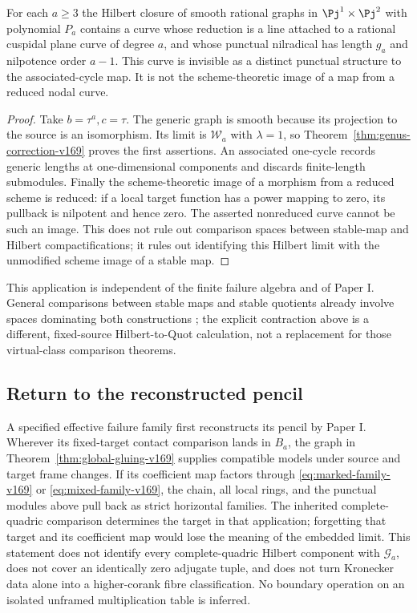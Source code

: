 \begin{corollary}
\label{cor:external-curves-v169}
For each $a\geq3$ the Hilbert closure of smooth rational graphs in
$\Pj^1\times\Pj^2$ with polynomial $P_a$ contains a curve whose
reduction is a line attached to a rational cuspidal plane curve of
degree $a$, and whose punctual nilradical has length $g_a$ and
nilpotence order $a-1$. This curve is invisible as a distinct punctual
structure to the associated-cycle map. It is not the scheme-theoretic
image of a map from a reduced nodal curve.
\end{corollary}
\begin{proof}
Take $b=\tau^a,c=\tau$. The generic graph is smooth because its
projection to the source is an isomorphism. Its limit is
$\mathcal W_a$ with $\lambda=1$, so
Theorem~\ref{thm:genus-correction-v169} proves the first assertions.
An associated one-cycle records generic lengths at one-dimensional
components and discards finite-length submodules. Finally the
scheme-theoretic image of a morphism from a reduced scheme is reduced:
if a local target function has a power mapping to zero, its pullback
is nilpotent and hence zero. The asserted nonreduced curve cannot
be such an image. This does not rule out comparison spaces between
stable-map and Hilbert compactifications; it rules out identifying
this Hilbert limit with the unmodified scheme image of a stable map.
\end{proof}
This application is independent of the finite failure algebra and of
Paper I. General comparisons between stable maps and stable quotients
already involve spaces dominating both constructions
\cite{Manolache169}; the explicit contraction above is a different,
fixed-source Hilbert-to-Quot calculation, not a replacement for those
virtual-class comparison theorems.

\subsection{Return to the reconstructed pencil}
A specified effective failure family first reconstructs its pencil by
Paper I. Wherever its fixed-target contact comparison lands in $B_a$,
the graph in Theorem~\ref{thm:global-gluing-v169} supplies compatible
models under source and target frame changes. If its coefficient map
factors through \eqref{eq:marked-family-v169} or
\eqref{eq:mixed-family-v169}, the chain, all local rings, and the
punctual modules above pull back as strict horizontal families.
The inherited complete-quadric comparison determines the target in
that application; forgetting that target and its coefficient map
would lose the meaning of the embedded limit. This statement does
not identify every complete-quadric Hilbert component with
$\mathcal G_a$, does not cover an identically zero adjugate tuple,
and does not turn Kronecker data alone into a higher-corank fibre
classification. No boundary operation on an isolated unframed
multiplication table is inferred.

